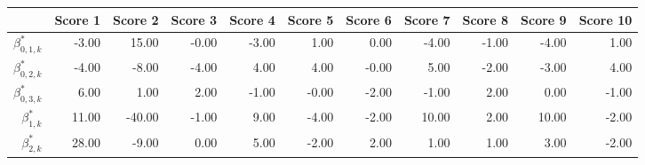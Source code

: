 \begin{table}[ht]
\centering
\begin{tabular}{rrrrrrrrrrr}
  \hline
 & Score 1 & Score 2 & Score 3 & Score 4 & Score 5 & Score 6 & Score 7 & Score 8 & Score 9 & Score 10 \\ 
  \hline
$\beta_{0, 1, k}^*$ & -3.00 & 15.00 & -0.00 & -3.00 & 1.00 & 0.00 & -4.00 & -1.00 & -4.00 & 1.00 \\ 
  $\beta_{0, 2, k}^*$ & -4.00 & -8.00 & -4.00 & 4.00 & 4.00 & -0.00 & 5.00 & -2.00 & -3.00 & 4.00 \\ 
  $\beta_{0, 3, k}^*$ & 6.00 & 1.00 & 2.00 & -1.00 & -0.00 & -2.00 & -1.00 & 2.00 & 0.00 & -1.00 \\ 
  $\beta_{1, k}^*$ & 11.00 & -40.00 & -1.00 & 9.00 & -4.00 & -2.00 & 10.00 & 2.00 & 10.00 & -2.00 \\ 
  $\beta_{2, k}^*$ & 28.00 & -9.00 & 0.00 & 5.00 & -2.00 & 2.00 & 1.00 & 1.00 & 3.00 & -2.00 \\ 
   \hline
\end{tabular}
\end{table}
